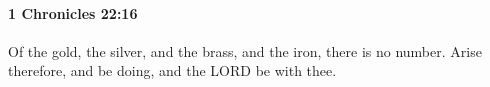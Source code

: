 
		\paragraph{1 Chronicles 22:16} %
			\label{1CHRONICLES-22-16}

			Of the gold, the silver, and the brass, and the iron, there is no number. Arise therefore, and be doing, and the LORD be with thee.


